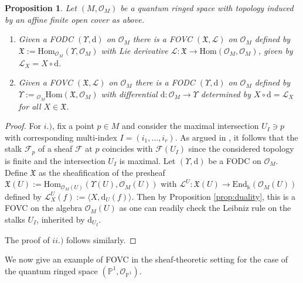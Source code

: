 \documentclass{article}
\newtheorem{proposition}[thm]{Proposition}
\theoremstyle{definition}
\newcommand{\cO}{{\mathcal{O}}}
\newcommand{\bP}{{\mathbb{P}}}
\newcommand{\lra}{{\longrightarrow}}
\begin{document}
\begin{proposition}
Let $(M,\cO_M)$ be a quantum ringed space 
with topology induced by an affine finite open cover as above.
\begin{enumerate}
	\item[i.)] Given a FODC $(\Upsilon,\mathrm{d})$ on $\mathcal{O}_M$ there is a FOVC $(\mathfrak{X},\mathscr{L})$
	on $\cO_M$ defined by $\mathfrak{X}:=\mathrm{Hom}_{\cO_M}(\Upsilon,\cO_M)$
	with Lie derivative $\mathscr{L}\colon\mathfrak{X} \lra \mathrm{Hom}(\cO_M,\cO_M)$,
	given by $\mathscr{L}_X= X \circ\mathrm{d}$.
	
	\item[ii.)] Given a FOVC $(\mathfrak{X},\mathscr{L})$ on $\mathcal{O}_M$ there is a FODC
	$(\Upsilon,\mathrm{d})$ on $\mathcal{O}_M$ defined by
	$\Upsilon:={}_{\cO_M}\mathrm{Hom}(\mathfrak{X},\cO_M)$ with differential $\mathrm{d}\colon \cO_M\to\Upsilon$
	determined by $X \circ \mathrm{d}=\mathscr{L}_X$ for all $X\in\mathfrak{X}$.
\end{enumerate}
\end{proposition}

\begin{proof}
For $i.)$, fix a point $p\in M$ and consider the maximal intersection $U_I\ni p$ with corresponding multi-index $I=(i_1,\ldots,i_r)$. As argued in \cite[Section 4.1]{aflw}, it follows that the stalk $\mathcal{F}_p$ of a sheaf $\mathcal{F}$ at $p$ coincides with $\mathcal{F}(U_I)$ since the considered topology is finite and the intersection $U_I$ is maximal.
Let $(\Upsilon,\mathrm{d})$ be a FODC on $\mathcal{O}_M$. 
Define $\mathfrak{X}$ as the sheafification of the presheaf 
$\mathfrak{X}(U):=\mathrm{Hom}_{\mathcal{O}_M(U)}(\Upsilon(U),\mathcal{O}_M(U))$ with $\mathscr{L}^{U}\colon\mathfrak{X}(U)\to\mathrm{End}_\Bbbk(\mathcal{O}_M(U))$ defined by $\mathscr{L}^U_X(f):=\langle X,\mathrm{d}_U(f)\rangle$.
Then by Proposition \ref{prop:duality}, this is a FOVC on the algebra $\mathcal{O}_M(U)$ as
one can readily check the Leibniz rule on the stalks $U_I$, inherited by $\mathrm{d}_{U_I}$.

The proof of $ii.)$ follows similarly.
\end{proof}

We now give an example of FOVC in the sheaf-theoretic setting for the case of the quantum ringed space $(\bP^1, \cO_{\bP^1})$.
\end{document}
